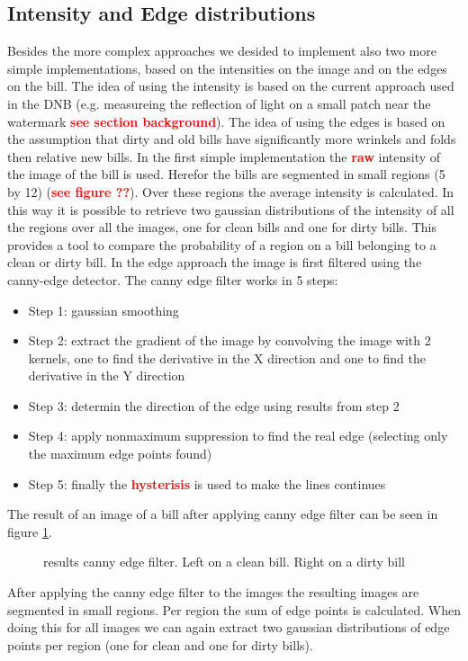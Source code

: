 \documentclass[11pt,twocolumn]{article}
\newcommand{\todo}[1]{\textcolor{red}{\textbf{#1}}}
\begin{document}
		\subsection{Intensity and Edge distributions}\label{sec:Intensity_Edge}
			\hspace*{10px}Besides the more complex approaches we desided to implement
			also two more simple implementations, based on the intensities on the image
			and on the edges on the bill. The idea of using the intensity is based on
			the current approach used in the DNB (e.g. measureing the reflection of
			light on a small patch near the watermark \todo{see section background}).
			The idea of using the edges is based on the assumption that dirty and old
			bills have significantly more wrinkels and folds then relative new bills. In
			the first simple implementation the \todo{raw} intensity of the image of the
			bill is used. Herefor the bills are segmented in small regions (5 by 12)
			(\todo{see figure ??}). Over these regions the average intensity is
			calculated. In this way it is possible to retrieve two gaussian distributions
			of the intensity of all the regions over all the images, one for clean bills
			and one for dirty bills. This provides a tool to compare the probability
			of a region on a bill belonging to a clean or dirty bill.
			In the edge approach the image is first filtered using the canny-edge
			detector. The canny edge filter works in 5 steps: 
			\begin{itemize} 
				\item Step 1: gaussian smoothing 
				\item Step 2: extract the gradient of the image by convolving the image
						with 2 kernels, one to find the derivative in the X direction and one to
						find the derivative in the Y direction				
				\item Step 3: determin the direction of the edge using results from step 2  
				\item Step 4: apply nonmaximum suppression to find the real edge (selecting
						only the maximum edge points found)
				\item Step 5: finally the \todo{hysterisis} is used to make the lines
						continues
            \end{itemize} 
            The result of an image of a bill after applying canny edge filter
            can be seen in figure \ref{canny5Euro}.
            \begin{figure}[!hbtp]
				\centering 
				\caption{results canny edge filter. Left on a clean bill. Right on a dirty
				bill} 
				\label{canny5Euro} 
			\end{figure} 
			After applying the canny edge filter to the images the resulting images are
			segmented in small regions. Per region the sum of edge points is calculated.
			When doing this for all images we can again extract two gaussian
			distributions of edge points per region (one for clean and one for dirty
			bills).
\end{document}

